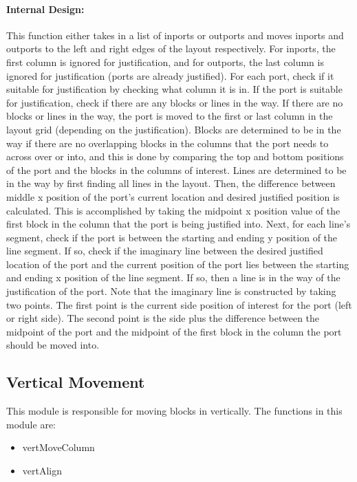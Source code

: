\documentclass[12pt,letterpaper]{report}
\begin{document}
\paragraph{Internal Design:} This function either takes in a list of inports or outports and moves inports and outports to the left and right edges of the layout respectively. For inports, the first column is ignored for justification, and for outports, the last column is ignored for justification (ports are already justified). For each port, check if it suitable for justification by checking what column it is in. If the port is suitable for justification, check if there are any blocks or lines in the way. If there are no blocks or lines in the way, the port is moved to the first or last column in the layout grid (depending on the justification). Blocks are determined to be in the way if there are no overlapping blocks in the columns that the port needs to across over or into, and this is done by comparing the top and bottom positions of the port and the blocks in the columns of interest. Lines are determined to be in the way by first finding all lines in the layout. Then, the difference between middle x position of the port's current location and desired justified position is calculated. This is accomplished by taking the midpoint x position value of the first block in the column that the port is being justified into. Next, for each line's segment, check if the port is between the starting and ending y position of the line segment. If so, check if the imaginary line between the desired justified location of the port and the current position of the port lies between the starting and ending x position of the line segment. If so, then a line is in the way of the justification of the port. Note that the imaginary line is constructed by taking two points. The first point is the current side position of interest for the port (left or right side). The second point is the side plus the difference between the midpoint of the port and the midpoint of the first block in the column the port should be moved into.

\subsection{Vertical Movement} \label{Vertical_Movement}
\par This module is responsible for moving blocks in vertically. The functions in this module are:
\begin{itemize}
	\item vertMoveColumn
	\item vertAlign
\end{itemize}
\end{document}
